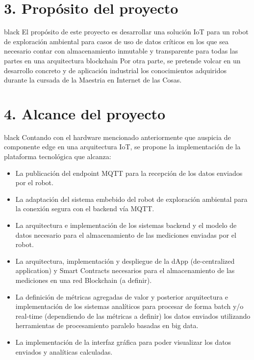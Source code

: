 \documentclass[
11pt, %
]{charter}
\begin{document}
\section{3. Propósito del proyecto}
\label{sec:proposito}

\begin{consigna}{black}
El propósito de este proyecto es desarrollar una solución IoT para un robot de exploración ambiental para casos de uso de datos críticos en los que sea necesario contar con almacenamiento inmutable y transparente para todas las partes en una arquitectura blockchain
Por otra parte, se pretende volcar en un desarrollo concreto y de aplicación industrial los conocimientos adquiridos durante la cursada de la Maestria en Internet de las Cosas.

\end{consigna}

\section{4. Alcance del proyecto}
\label{sec:alcance}

\begin{consigna}{black}
Contando con el hardware mencionado anteriormente que auspicia de componente edge en una arquitectura IoT, se propone la implementación de la plataforma tecnológica que alcanza:

\begin{itemize}
	\item La publicación del endpoint MQTT para la recepción de los datos enviados por el robot.
	\item La adaptación del sistema embebido del robot de exploración ambiental para la conexión segura con el backend vía MQTT.
	\item La arquitectura e implementación de los sistemas backend y el modelo de datos necesario para el almacenamiento de las mediciones enviadas por el robot.
	\item La arquitectura, implementación y despliegue de la dApp (de-centralized application) y Smart Contracts necesarios para el almacenamiento de las mediciones en una red Blockchain (a definir).
	\item La definición de métricas agregadas de valor y posterior arquitectura e implementación de los sistemas analíticos para procesar de forma batch y/o real-time (dependiendo de las métricas a definir) los datos enviados utilizando herramientas de procesamiento paralelo basadas en big data.
	\item La implementación de la interfaz gráfica para poder visualizar los datos enviados y analíticas calculadas.

\end{itemize}


\end{consigna}
\end{document}

